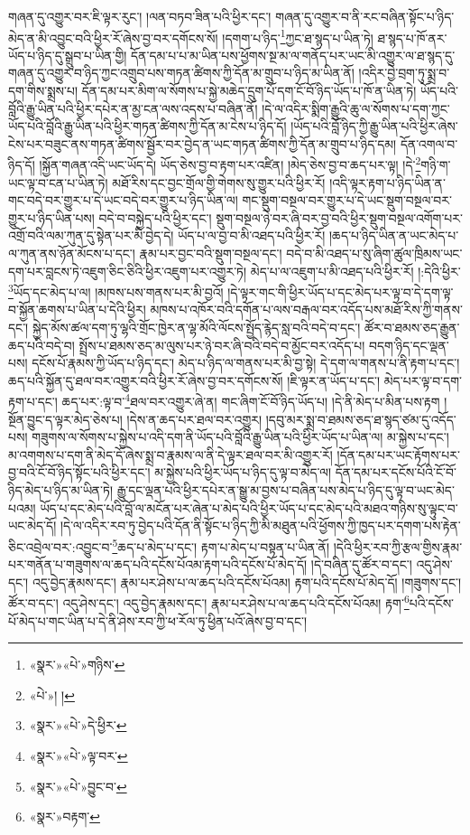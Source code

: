གཞན་དུ་འགྱུར་བར་ཇི་ལྟར་རུང་། །ལན་བཏབ་ཟིན་པའི་ཕྱིར་དང་། གཞན་དུ་འགྱུར་བ་ནི་རང་བཞིན་སྟོང་པ་ཉིད་མེད་ན་མི་འབྱུང་བའི་ཕྱིར་རོ་ཞེས་བྱ་བར་དགོངས་སོ། །དགག་པ་ཉིད་\footnote{«སྣར་»«པེ་»གཉིས་}ཀྱང་ཐ་སྙད་པ་ཡིན་ཏེ། ཐ་སྙད་པ་ཁོ་ནར་ཡོད་པ་ཉིད་དུ་སྒྲུབ་པ་ཡིན་གྱི། དོན་དམ་པ་པ་མ་ཡིན་པས་ཕྱོགས་སྔ་མ་ལ་གནོད་པར་ཡང་མི་འགྱུར་ལ་ཐ་སྙད་དུ་གཞན་དུ་འགྱུར་བ་ཉིད་ཀྱང་འགྲུབ་པས་གཏན་ཚིགས་ཀྱི་དོན་མ་གྲུབ་པ་ཉིད་མ་ཡིན་ནོ། །འདིར་བྱེ་བྲག་ཏུ་སྨྲ་བ་དག་གིས་སྨྲས་པ། དོན་དམ་པར་མིག་ལ་སོགས་པ་སྐྱེ་མཆེད་དྲུག་པོ་དག་ངོ་བོ་ཉིད་ཡོད་པ་ཁོ་ན་ཡིན་ཏེ། ཡོད་པའི་བློའི་རྒྱུ་ཡིན་པའི་ཕྱིར་དཔེར་ན་མྱ་ངན་ལས་འདས་པ་བཞིན་ནོ། །དེ་ལ་འདིར་སྨིག་རྒྱུའི་ཆུ་ལ་སོགས་པ་དག་ཀྱང་ཡོད་པའི་བློའི་རྒྱུ་ཡིན་པའི་ཕྱིར་གཏན་ཚིགས་ཀྱི་དོན་མ་ངེས་པ་ཉིད་དོ། །ཡོད་པའི་བློ་ཉིད་ཀྱི་རྒྱུ་ཡིན་པའི་ཕྱིར་ཞེས་ངེས་པར་བཟུང་ནས་གཏན་ཚིགས་སྦྱོར་བར་བྱེད་ན་ཡང་གཏན་ཚིགས་ཀྱི་དོན་མ་གྲུབ་པ་ཉིད་དམ། དོན་འགལ་བ་ཉིད་དོ། །སྐྱོན་གཞན་འདི་ཡང་ཡོད་དེ། ཡོད་ཅེས་བྱ་བ་རྟག་པར་འཛིན། །མེད་ཅེས་བྱ་བ་ཆད་པར་ལྟ། །དེ་\footnote{«པེ་»། །}གཉི་ག་ཡང་ལྟ་བ་ངན་པ་ཡིན་ཏེ། མཐོ་རིས་དང་བྱང་གྲོལ་གྱི་གེགས་སུ་གྱུར་པའི་ཕྱིར་རོ། །འདི་ལྟར་རྟག་པ་ཉིད་ཡིན་ན་གང་བདེ་བར་གྱུར་པ་དེ་ཡང་བདེ་བར་གྱུར་པ་ཉིད་ཡིན་ལ། གང་སྡུག་བསྔལ་བར་གྱུར་པ་དེ་ཡང་སྡུག་བསྔལ་བར་གྱུར་པ་ཉིད་ཡིན་པས། བདེ་བ་བསྐྱེད་པའི་ཕྱིར་དང་། སྡུག་བསྔལ་ཉེ་བར་ཞི་བར་བྱ་བའི་ཕྱིར་སྡུག་བསྔལ་འགོག་པར་འགྲོ་བའི་ལམ་ཀུན་དུ་སྟེན་པར་མི་བྱེད་དེ། ཡོད་པ་ལ་བྱ་བ་མི་འཐད་པའི་ཕྱིར་རོ། །ཆད་པ་ཉིད་ཡིན་ན་ཡང་མེད་པ་ལ་ཀུན་ནས་ཉོན་མོངས་པ་དང་། རྣམ་པར་བྱང་བའི་སྡུག་བསྔལ་དང་། བདེ་བ་མི་འཐད་པ་སུ་ཞིག་ཚུལ་ཁྲིམས་ཡང་དག་པར་བླངས་ཏེ་འཇུག་ཅིང་ཅིའི་ཕྱིར་འཇུག་པར་འགྱུར་ཏེ། མེད་པ་ལ་འཇུག་པ་མི་འཐད་པའི་ཕྱིར་རོ། །:དེའི་ཕྱིར་\footnote{«སྣར་»«པེ་»དེ་ཕྱིར་}ཡོད་དང་མེད་པ་ལ། །མཁས་པས་གནས་པར་མི་བྱའོ། །དེ་ལྟར་གང་གི་ཕྱིར་ཡོད་པ་དང་མེད་པར་ལྟ་བ་དེ་དག་ལྟ་བ་སྐྱོན་ཆགས་པ་ཡིན་པ་དེའི་ཕྱིར། མཁས་པ་འཁོར་བའི་དགོན་པ་ལས་བརྒལ་བར་འདོད་པས་མཐོ་རིས་ཀྱི་གནས་དང་། སྐྱེད་མོས་ཚལ་དག་ཏུ་ལྷའི་གྲོང་ཁྱེར་ན་ལྷ་མོའི་ལོངས་སྤྱོད་རྙེད་སླ་བའི་བདེ་བ་དང་། ཚོར་བ་ཐམས་ཅད་རྒྱུན་ཆད་པའི་བདེ་བ། སྤྲོས་པ་ཐམས་ཅད་མ་ལུས་པར་ཉེ་བར་ཞི་བའི་བདེ་བ་མྱོང་བར་འདོད་པ། བདག་ཉིད་དང་ལྡན་པས། དངོས་པོ་རྣམས་ཀྱི་ཡོད་པ་ཉིད་དང་། མེད་པ་ཉིད་ལ་གནས་པར་མི་བྱ་སྟེ། དེ་དག་ལ་གནས་པ་ནི་རྟག་པ་དང་། ཆད་པའི་སྐྱོན་དུ་ཐལ་བར་འགྱུར་བའི་ཕྱིར་རོ་ཞེས་བྱ་བར་དགོངས་སོ། །ཇི་ལྟར་ན་ཡོད་པ་དང་། མེད་པར་ལྟ་བ་དག་རྟག་པ་དང་། ཆད་པར་:ལྟ་བ་\footnote{«སྣར་»«པེ་»ལྟ་བར་}ཐལ་བར་འགྱུར་ཞེ་ན། གང་ཞིག་ངོ་བོ་ཉིད་ཡོད་པ། །དེ་ནི་མེད་པ་མིན་པས་རྟག །སྔོན་བྱུང་ད་ལྟར་མེད་ཅེས་པ། །དེས་ན་ཆད་པར་ཐལ་བར་འགྱུར། །དབུ་མར་སྨྲ་བ་ཐམས་ཅད་ཐ་སྙད་ཙམ་དུ་འདོད་པས། གཟུགས་ལ་སོགས་པ་སྐྱེས་པ་འདི་དག་ནི་ཡོད་པའི་བློའི་རྒྱུ་ཡིན་པའི་ཕྱིར་ཡོད་པ་ཡིན་ལ། མ་སྐྱེས་པ་དང་། མ་འགགས་པ་དག་ནི་མེད་དོ་ཞེས་སྨྲ་བ་རྣམས་ལ་ནི་དེ་ལྟར་ཐལ་བར་མི་འགྱུར་རོ། །དོན་དམ་པར་ཡང་རྟོགས་པར་བྱ་བའི་ངོ་བོ་ཉིད་སྟོང་པའི་ཕྱིར་དང་། མ་སྐྱེས་པའི་ཕྱིར་ཡོད་པ་ཉིད་དུ་ལྟ་བ་མེད་ལ། དོན་དམ་པར་དངོས་པོའི་ངོ་བོ་ཉིད་མེད་པ་ཉིད་མ་ཡིན་ཏེ། རྒྱུ་དང་ལྡན་པའི་ཕྱིར་དཔེར་ན་སྒྱུ་མ་བྱས་པ་བཞིན་པས་མེད་པ་ཉིད་དུ་ལྟ་བ་ཡང་མེད་པའམ། ཡོད་པ་དང་མེད་པའི་བློ་ལ་མངོན་པར་ཞེན་པ་མེད་པའི་ཕྱིར་ཡོད་པ་དང་མེད་པའི་མཐའ་གཉིས་སུ་ལྟུང་བ་ཡང་མེད་དོ། །དེ་ལ་འདིར་རབ་ཏུ་བྱེད་པའི་དོན་ནི་སྟོང་པ་ཉིད་ཀྱི་མི་མཐུན་པའི་ཕྱོགས་ཀྱི་ཁྱད་པར་དགག་པས་རྟེན་ཅིང་འབྲེལ་བར་:འབྱུང་བ་\footnote{«སྣར་»«པེ་»བྱུང་བ་}ཆད་པ་མེད་པ་དང་། རྟག་པ་མེད་པ་བསྟན་པ་ཡིན་ནོ། །དེའི་ཕྱིར་རབ་ཀྱི་རྩལ་གྱིས་རྣམ་པར་གནོན་པ་གཟུགས་ལ་ཆད་པའི་དངོས་པོའམ་རྟག་པའི་དངོས་པོ་མེད་དོ། །དེ་བཞིན་དུ་ཚོར་བ་དང་། འདུ་ཤེས་དང་། འདུ་བྱེད་རྣམས་དང་། རྣམ་པར་ཤེས་པ་ལ་ཆད་པའི་དངོས་པོའམ། རྟག་པའི་དངོས་པོ་མེད་དོ། །གཟུགས་དང་། ཚོར་བ་དང་། འདུ་ཤེས་དང་། འདུ་བྱེད་རྣམས་དང་། རྣམ་པར་ཤེས་པ་ལ་ཆད་པའི་དངོས་པོའམ། རྟག་\footnote{«སྣར་»བརྟག་}པའི་དངོས་པོ་མེད་པ་གང་ཡིན་པ་དེ་ནི་ཤེས་རབ་ཀྱི་ཕ་རོལ་ཏུ་ཕྱིན་པའོ་ཞེས་བྱ་བ་དང་། 
